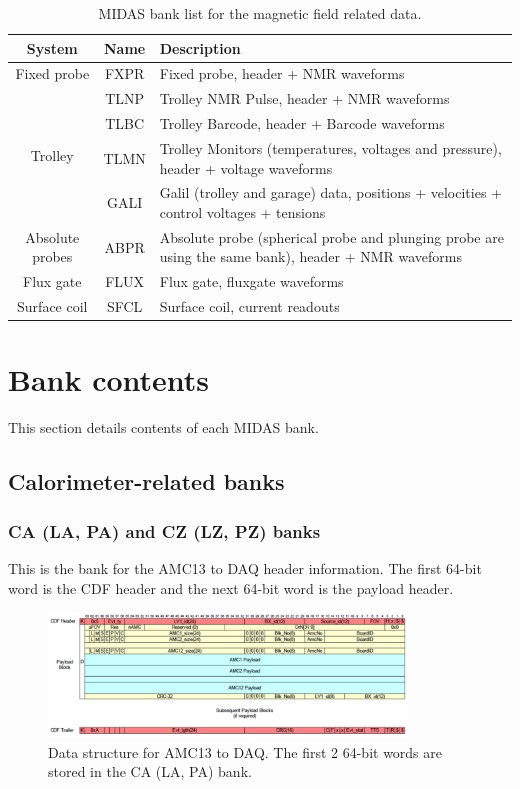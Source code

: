 \begin{table}[htbp]
\centering
\caption{MIDAS bank list for the magnetic field related data.}
\begin{tabular}{|c|c|p{11cm}|}
\hline
System & Name & Description \\
\hline
Fixed probe & FXPR & Fixed probe, header + NMR waveforms \\
\hline
\multirow{4}{*}{Trolley} & TLNP & Trolley NMR Pulse, header + NMR waveforms\\
\cline{2-3}
& TLBC &  Trolley Barcode, header + Barcode waveforms \\
\cline{2-3}
& TLMN & Trolley Monitors (temperatures, voltages and pressure), header + voltage waveforms \\
\cline{2-3}
& GALI &  Galil (trolley and garage) data, positions + velocities + control voltages + tensions\\
\hline
Absolute probes &  ABPR &
Absolute probe (spherical probe and plunging probe are using the same bank), header + NMR waveforms \\ 
\hline
Flux gate & FLUX & Flux gate, fluxgate waveforms \\
\hline
Surface coil & SFCL & Surface coil, current readouts\\
\hline
\end{tabular} 
\label{tab:fieldtable}
\end{table}

\newpage
\section{Bank contents}

This section details contents of each MIDAS bank. 

\subsection{Calorimeter-related banks}

\subsubsection*{CA (LA, PA) and CZ (LZ, PZ) banks}

This is the bank for the AMC13 to DAQ header information.
The first 64-bit word is the CDF header and the next 64-bit word is the payload header.

\begin{figure}[htbp]
\centering
\includegraphics[width=0.85\textwidth]{pics/AMC13ToDAQ.pdf} 
\caption{Data structure for AMC13 to DAQ. The first 2 64-bit words are stored in the CA (LA, PA) bank.}\label{fig:AMC13ToDAQ}
\end{figure}

